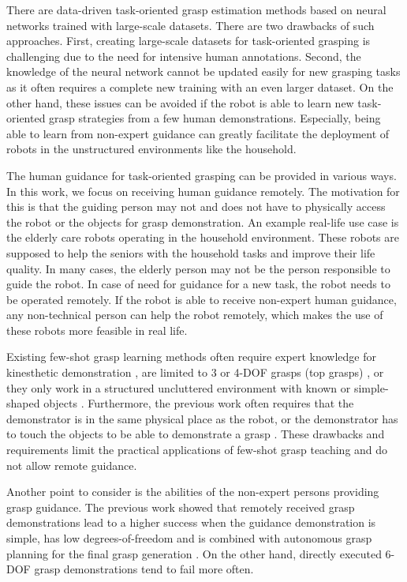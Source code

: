 \documentclass[letterpaper]{article} %
\begin{document}
There are data-driven task-oriented grasp estimation methods based on neural networks trained with large-scale datasets. There are two drawbacks of such approaches. First, creating large-scale datasets for task-oriented grasping is challenging due to the need for intensive human annotations.
Second, the knowledge of the neural network cannot be updated easily for new grasping tasks as it often requires a complete new training with an even larger dataset. On the other hand, these issues can be avoided if the robot is able to learn new task-oriented grasp strategies from a few human demonstrations. Especially, being able to learn from non-expert guidance can greatly facilitate the deployment of robots in the unstructured environments like the household.

The human guidance for task-oriented grasping can be provided in various ways. In this work, we focus on receiving human guidance remotely. The motivation for this is that the guiding person may not and does not have to physically access the robot or the objects for grasp demonstration. An example real-life use case is the elderly care robots operating in the household environment. These robots are supposed to help the seniors with the household tasks and improve their life quality. In many cases, the elderly person may not be the person responsible to guide the robot. In case of need for guidance for a new task, the robot needs to be operated remotely. If the robot is able to receive non-expert human guidance, any non-technical person can help the robot remotely, which makes the use of these robots more feasible in real life.

Existing few-shot grasp learning methods often require expert knowledge for kinesthetic demonstration \cite{kopicki2016one}, are limited to 3 or 4-DOF grasps (top grasps) \cite{van2018learning,yang2021attribute, guo2022few}, or they only work in a structured uncluttered environment with known or simple-shaped objects \cite{van2018learning}. Furthermore, the previous work often requires that the demonstrator is in the same physical place as the robot, or the demonstrator has to touch the objects to be able to demonstrate a grasp \cite{helenon2020learning, wang2021demograsp,saito2022task}. These drawbacks and requirements limit the practical applications of few-shot grasp teaching and do not allow remote guidance.

Another point to consider is the abilities of the non-expert persons providing grasp guidance. The previous work showed that remotely received grasp demonstrations lead to a higher success when the guidance demonstration is simple, has low degrees-of-freedom and is combined with autonomous grasp planning for the final grasp generation \cite{leeper2012strategies,kent2020leveraging}. On the other hand, directly executed 6-DOF grasp demonstrations tend to fail more often.
\end{document}
